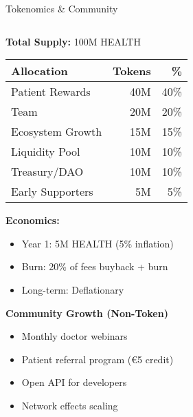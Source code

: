 \documentclass[aspectratio=169,xcolor=dvipsnames,14pt]{beamer}
\newcommand{\checkitem}{\item[\color{SuccessGreen}\faCheckCircle]}
\begin{document}
\begin{frame}{Tokenomics \& Community}
\begin{columns}[T]
\begin{column}{0.5\textwidth}
      \textbf{Total Supply:} 100M HEALTH

      \begin{table}
        \scriptsize
        \begin{tabular}{lrr}
          \toprule
          \textbf{Allocation} & \textbf{Tokens} & \textbf{\%} \\
          \midrule
          Patient Rewards & 40M & 40\% \\
          Team & 20M & 20\% \\
          Ecosystem Growth & 15M & 15\% \\
          Liquidity Pool & 10M & 10\% \\
          Treasury/DAO & 10M & 10\% \\
          Early Supporters & 5M & 5\% \\
          \bottomrule
        \end{tabular}
      \end{table}

      \vspace{0.3cm}

      \textbf{Economics:}
      \begin{itemize}
        \checkitem Year 1: 5M HEALTH (5\% inflation)
        \checkitem Burn: 20\% of fees buyback + burn
        \checkitem Long-term: Deflationary
      \end{itemize}

      \vspace{0.3cm}

      \textbf{\textcolor{FadjmaBlue}{Community Growth (Non-Token)}}
      \begin{itemize}
        \checkitem Monthly doctor webinars
        \checkitem Patient referral program (€5 credit)
        \checkitem Open API for developers
        \checkitem Network effects scaling
      \end{itemize}
    \end{column}
  \end{columns}

\end{frame}
\end{document}
